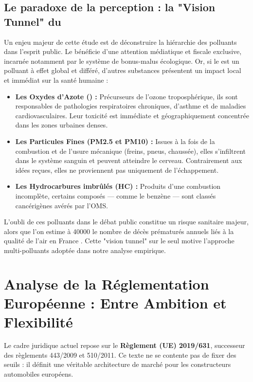 \documentclass[12pt, a4paper]{article}
\begin{document}
\subsection{Le paradoxe de la perception : la "Vision Tunnel" du \texorpdfstring{}{CO2}}

Un enjeu majeur de cette étude est de déconstruire la hiérarchie des polluants dans l'esprit public. Le  bénéficie d'une attention médiatique et fiscale exclusive, incarnée notamment par le système de bonus-malus écologique. Or, si le  est un polluant à effet global et différé, d'autres substances présentent un impact local et immédiat sur la santé humaine :

\begin{itemize}
    \item \textbf{Les Oxydes d'Azote () :} Précurseurs de l'ozone troposphérique, ils sont responsables de pathologies respiratoires chroniques, d'asthme et de maladies cardiovasculaires. Leur toxicité est immédiate et géographiquement concentrée dans les zones urbaines denses.
    \item \textbf{Les Particules Fines (PM2.5 et PM10) :} Issues à la fois de la combustion et de l'usure mécanique (freins, pneus, chaussée), elles s'infiltrent dans le système sanguin et peuvent atteindre le cerveau. Contrairement aux idées reçues, elles ne proviennent pas uniquement de l'échappement.
    \item \textbf{Les Hydrocarbures imbrûlés (HC) :} Produits d'une combustion incomplète, certains composés — comme le benzène — sont classés cancérigènes avérés par l'OMS.
\end{itemize}

L'oubli de ces polluants dans le débat public constitue un risque sanitaire majeur, alors que l'on estime à \num{40000} le nombre de décès prématurés annuels liés à la qualité de l'air en France \cite{giec2023}. Cette "vision tunnel" sur le seul  motive l'approche multi-polluants adoptée dans notre analyse empirique.

\section{Analyse de la Réglementation Européenne : Entre Ambition et Flexibilité}

Le cadre juridique actuel repose sur le \textbf{Règlement (UE) 2019/631}, successeur des règlements 443/2009 et 510/2011. Ce texte ne se contente pas de fixer des seuils : il définit une véritable architecture de marché pour les constructeurs automobiles européens.
\end{document}
